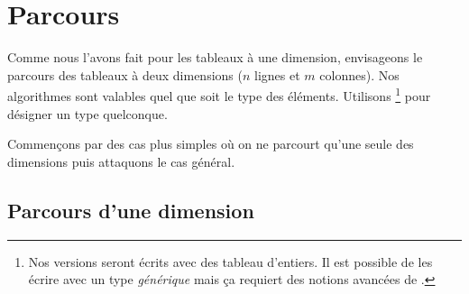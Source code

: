 		\begin{Solution}
			\begin{algo}
				\BlankLine
				\BlankLine
				\BlankLine
				\BlankLine
			\end{algo}
		\end{Solution}
	
\section{Parcours}
\label{algo:Tab2D}

	Comme nous l'avons fait pour les tableaux à  une dimension,
	envisageons le parcours des tableaux à deux dimensions 
	($n$ lignes et $m$ colonnes).
	Nos algorithmes sont valables quel que soit le type des éléments.
	Utilisons \lda{T}%
	\footnote{%
		Nos versions  seront écrits avec des tableau d'entiers.
		Il est possible de les écrire avec un type \emph{générique} \lda{T}
		mais ça requiert des notions avancées de \bsc{Java}.
	} pour désigner un type quelconque.
	
	\begin{algo}
		\Decl{tab}{\Array{n $\times$ m}{T}}\;
	\end{algo}
	
	Commençons par des cas plus simples 
	où on ne parcourt qu'une seule des dimensions 
	puis attaquons le cas général.

	\subsection{Parcours d'une dimension}
	
